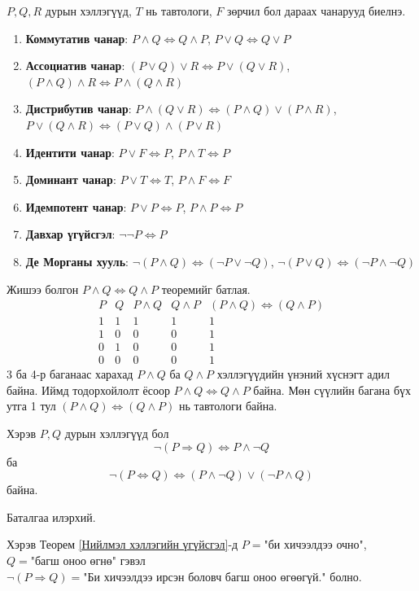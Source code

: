 \begin{theorem} \label{Хэллэгийн холбоосын чанарууд} $P, Q, R$ дурын хэллэгүүд, $T$ нь тавтологи, $F$ зөрчил бол дараах чанарууд биелнэ.
  \begin{enumerate}
      \item \textbf{Коммутатив чанар}: $P\land Q\Leftrightarrow Q\land P$, $P\lor Q\Leftrightarrow Q\lor P$
      \item \textbf{Ассоциатив чанар}: $(P\lor Q)\lor R\Leftrightarrow P\lor(Q\lor R)$, $(P\land Q)\land R\Leftrightarrow P\land(Q\land R)$
      \item \textbf{Дистрибутив чанар}: $P\land(Q\lor R)\Leftrightarrow (P\land Q)\lor(P\land R)$, $P\lor(Q\land R)\Leftrightarrow (P\lor Q)\land(P\lor R)$
      \item \textbf{Идентити чанар}: $P\lor F\Leftrightarrow P$, $P\land T\Leftrightarrow P$
      \item \textbf{Доминант чанар}: $P\lor T\Leftrightarrow T$, $P\land F\Leftrightarrow F$
      \item \textbf{Идемпотент чанар}: $P\lor P\Leftrightarrow P$, $P\land P\Leftrightarrow P$
      \item \textbf{Давхар үгүйсгэл}: $\lnot\lnot P\Leftrightarrow P$
      \item \textbf{Де Морганы хууль}: $\lnot(P\land Q)\Leftrightarrow(\lnot P\lor\lnot Q)$, $\lnot(P\lor Q)\Leftrightarrow(\lnot P\land\lnot Q)$
  \end{enumerate}  
\end{theorem}
\begin{prof}
Жишээ болгон $P\land Q\Leftrightarrow Q\land P$ теоремийг батлая. 
    \[
\begin{array}{c|c|c|c|c}
P & Q & P\land Q & Q\land P & (P\land Q)\Leftrightarrow(Q\land P)\\\hline
1 & 1 & 1 & 1 & 1\\
1 & 0 & 0 & 0 & 1\\
0 & 1 & 0 & 0 & 1\\
0 & 0 & 0 & 0 & 1
\end{array}
\]
3 ба 4-р баганаас харахад $P\land Q$ ба $Q\land P$ хэллэгүүдийн үнэний хүснэгт адил байна. Иймд тодорхойлолт ёсоор $P\land Q\Leftrightarrow Q\land P$ байна. Мөн сүүлийн багана бүх утга 1 тул \((P\land Q)\Leftrightarrow(Q\land P)\) нь тавтологи байна. 
\end{prof}
\begin{theorem}\label{Нийлмэл хэллэгийн үгүйсгэл}
Хэрэв $P, Q$ дурын хэллэгүүд бол 
$$\lnot(P\Rightarrow Q)\Leftrightarrow P\land\lnot Q$$ ба $$\lnot(P\Leftrightarrow Q)\Leftrightarrow(P\land\lnot Q)\lor(\lnot P\land Q)$$ байна.
    
\end{theorem}
\begin{prof}
    Баталгаа илэрхий.
\end{prof} 
\begin{example} Хэрэв Теорем \ref{Нийлмэл хэллэгийн үгүйсгэл}-д $P=\text{"би хичээлдээ очно"}$, $Q=\text{"багш оноо өгнө"}$ гэвэл $\lnot(P\Rightarrow Q)=\text{"Би хичээлдээ ирсэн боловч багш оноо өгөөгүй."}$ болно. 
\end{example}
